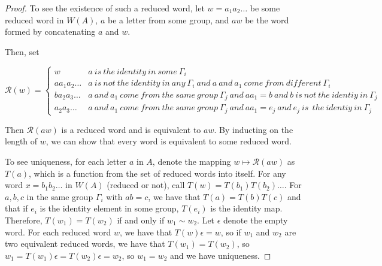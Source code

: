 



\begin{proof}
	
	To see the existence of such a reduced word, let $w=a_1a_2\dots$ be some reduced word in $W(A)$, $a$ be a letter from some group, and $aw$ be the word formed by concatenating $a$ and $w$.
	
	Then, set 
	
	\[
	\mathcal{R}(w) = \left\{
	\begin{array}{ll}
	w & a \ is \ the\ identity \ in \ some \ \Gamma_i \\
	aa_1a_2\dots  & a \ is \ not \ the  \ identity \ in \ any\ \Gamma_i \ and \ a \ and \ a_1 \ come \ from \ different \ \Gamma_i\\
	ba_2a_3\dots & a \ and \ a_1 \ come \ from \ the \ same \ group \ \Gamma_j  \ and \ aa_1=b \ and \ b \ is\ not \ the\ identiy  \ in \ \Gamma_j\\
	a_2a_3\dots & a \ and \ a_1 \ come \ from \ the \ same \ group \ \Gamma_j  \ and \ aa_1=e_j \ and \ e_j \ is\ \ the\ identiy  \ in \ \Gamma_j\
	\end{array}
	\right.
	\]
	
Then $\mathcal{R}(aw)$ is a reduced word and is equivalent to $aw$.  By inducting on the length of $w$, we can show that every word is equivalent to some reduced word.

To see uniqueness, for each letter $a$ in $A$, denote the mapping $w\mapsto \mathcal{R}(aw)$ as $T(a)$, which is a function from the set of reduced words into itself.  For any word $x=b_1b_2\dots$ in $W(A)$ (reduced or not), call $T(w)=T(b_1)T(b_2)\dots$.  For $a,b,c$ in the same group $\Gamma_i$ with  $ab=c$, we have that $T(a)=T(b)T(c)$ and that if $e_i$ is the identity element in some group, $T(e_i)$ is the identity map.  Therefore, $T(w_1)=T(w_2)$ if and only if $w_1\sim w_2$.  Let $\epsilon$ denote the empty word.  For each reduced word $w$, we have that $T(w)\epsilon = w$, so if $w_1$ and $w_2$ are two equivalent reduced words, we have that $T(w_1)=T(w_2)$, so $w_1=T(w_1)\epsilon = T(w_2)\epsilon = w_2$, so $w_1=w_2$ and we have uniqueness.
\end{proof}



